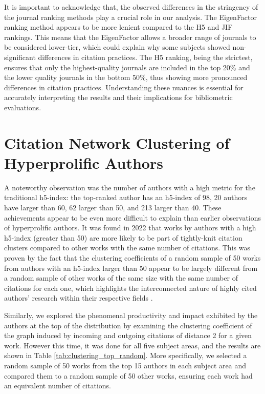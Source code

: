 It is important to acknowledge that, the observed differences in the stringency
of the journal ranking methods play a crucial role in our analysis. The
EigenFactor ranking method appears to be more lenient compared to the H5 and
JIF rankings. This means that the EigenFactor allows a broader range of
journals to be considered lower-tier, which could explain why some subjects
showed non-significant differences in citation practices. The H5 ranking, being
the strictest, ensures that only the highest-quality journals are included in
the top 20\% and the lower quality journals in the bottom 50\%, thus showing
more pronounced differences in citation practices. Understanding these nuances
is essential for accurately interpreting the results and their implications for
bibliometric evaluations.

\section{Citation Network Clustering of Hyperprolific Authors}

A noteworthy observation was the number of authors with a high metric for the
traditional h5-index: the top-ranked author has an h5-index of 98, 20 authors
have larger than 60, 62 larger than 50, and 213 larger than 40. These
achievements appear to be even more difficult to explain than earlier
observations of hyperprolific authors. It was found in 2022 that works by
authors with a high h5-index (greater than 50) are more likely to be part of
tightly-knit citation clusters compared to other works with the same number of
citations. This was proven by the fact that the clustering coefficients of a
random sample of 50 works from authors with an h5-index larger than 50 appear
to be largely different from a random sample of other works of the same size
with the same number of citations for each one, which highlights the
interconnected nature of highly cited authors' research within their respective
fields \cite{Spi23g}.

Similarly, we explored the phenomenal productivity and impact exhibited by the
authors at the top of the distribution by examining the clustering coefficient
of the graph induced by incoming and outgoing citations of distance 2 for a
given work. However this time, it was done for all five subject areas, and the
results are shown in Table \ref{tab:clustering_top_random}. More specifically,
we selected a random sample of 50 works from the top 15 authors in each subject
area and compared them to a random sample of 50 other works, ensuring each work
had an equivalent number of citations.

